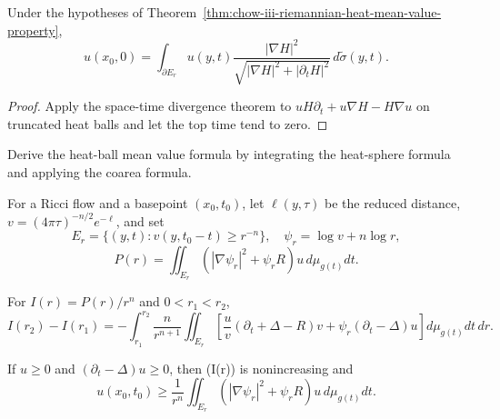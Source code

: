 \begin{theorem}
\label{thm:chow-iii-heat-sphere-mean-value-property}
Under the hypotheses of Theorem~\ref{thm:chow-iii-riemannian-heat-mean-value-property},
\[
 u(x_0,0)=\int_{\partial E_r}u(y,t)
 \frac{|\nabla H|^2}{\sqrt{|\nabla H|^2+|\partial_tH|^2}}
 \,d\widetilde\sigma(y,t).
\]
\end{theorem}
\begin{proof}
Apply the space-time divergence theorem to
\(uH\partial_t+u\nabla H-H\nabla u\) on truncated heat balls and let the
top time tend to zero.
\end{proof}

\begin{claim}
\label{clm:chow-iii-heat-sphere-coarea-exercise}
Derive the heat-ball mean value formula by integrating the heat-sphere formula
and applying the coarea formula.
\end{claim}

For a Ricci flow and a basepoint \((x_0,t_0)\), let \(\ell(y,\tau)\) be the
reduced distance, \(v=(4\pi\tau)^{-n/2}e^{-\ell}\), and set
\[
 E_r=\{(y,t):v(y,t_0-t)\ge r^{-n}\},\quad
 \psi_r=\log v+n\log r,
\]
\[
 P(r)=\iint_{E_r}(|\nabla\psi_r|^2+\psi_rR)u\,d\mu_{g(t)}dt.
\]

\begin{theorem}
\label{thm:chow-iii-ricci-flow-local-mean-value-monotonicity}
For \(I(r)=P(r)/r^n\) and \(0<r_1<r_2\),
\[
 I(r_2)-I(r_1)=-\int_{r_1}^{r_2}\frac n{r^{n+1}}
 \iint_{E_r}\left[
 \frac uv(\partial_t+\Delta-R)v+\psi_r(\partial_t-\Delta)u
 \right]d\mu_{g(t)}dt\,dr.
\]
\end{theorem}

\begin{corollary}
\label{cor:chow-iii-ricci-flow-supersolution-mean-value}
If \(u\ge0\) and \((\partial_t-\Delta)u\ge0\), then (I(r)) is
nonincreasing and
\[
 u(x_0,t_0)\ge\frac1{r^n}\iint_{E_r}
 (|\nabla\psi_r|^2+\psi_rR)u\,d\mu_{g(t)}dt.
\]
\end{corollary}

